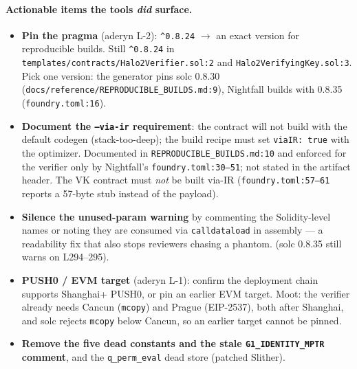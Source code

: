 \paragraph{Actionable items the tools \emph{did} surface.}
\begin{itemize}[leftmargin=1.4em,itemsep=2pt]
\item \textbf{Pin the pragma} (aderyn L-2): \texttt{\^{}0.8.24}
  $\to$ an exact version for reproducible builds.
   Still \texttt{\^{}0.8.24} in
  \texttt{templates/\allowbreak{}contracts/\allowbreak{}Halo2Verifier.sol:2} and
  \texttt{Halo2VerifyingKey.sol:3}. Pick one version: the generator
  pins solc 0.8.30 (\texttt{docs/\allowbreak{}reference/\allowbreak{}REPRODUCIBLE\_\allowbreak{}BUILDS.md:9}),
  Nightfall builds with 0.8.35 (\texttt{foundry.toml:16}).
\item \textbf{Document the \texttt{--via-ir} requirement}: the
  contract will not build with the default codegen
  (stack-too-deep); the build recipe must set \texttt{viaIR:
  true} with the optimizer.
   Documented in
  \texttt{REPRODUCIBLE\_\allowbreak{}BUILDS.md:10} and enforced for the verifier
  only by Nightfall's \texttt{foundry.toml:30--51}; not stated in the
  artifact header. The VK contract must \emph{not} be built via-IR
  (\texttt{foundry.toml:57--61} reports a 57-byte stub instead of
  the payload).
\item \textbf{Silence the unused-param warning} by commenting the
  Solidity-level names or noting they are consumed via
  \texttt{calldataload} in assembly --- a readability fix that
  also stops reviewers chasing a phantom.  (solc
  0.8.35 still warns on L294--295).
\item \textbf{PUSH0 / EVM target} (aderyn L-1): confirm the
  deployment chain supports Shanghai+ PUSH0, or pin an earlier
  EVM target.  Moot: the verifier already needs
  Cancun (\texttt{mcopy}) and Prague (EIP-2537), both after
  Shanghai, and solc rejects \texttt{mcopy} below Cancun, so an
  earlier target cannot be pinned.
\item \textbf{Remove the five dead constants and the stale
  \texttt{G1\_\allowbreak{}IDENTITY\_\allowbreak{}MPTR} comment}, and the \texttt{q\_perm\_eval}
  dead store (patched Slither). 
\end{itemize}

